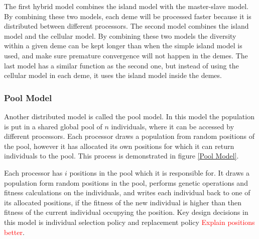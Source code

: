\noindent The first hybrid model combines the island model with the master-slave model. By combining these two models, each deme will be processed faster because it is distributed between different processors. The second model combines the island model and the cellular model. By combining these two models the diversity within a given deme can be kept longer than when the simple island model is used, and make sure premature convergence will not happen in the demes. The last model has a similar function as the second one, but instead of using the cellular model in each deme, it uses the island model inside the demes. \\


\subsubsection{Pool Model}
Another distributed model is called the pool model. In this model the population is put in a shared global pool of $n$ individuals, where it can be accessed by different processors. Each processor draws a population from random positions of the pool, however it has allocated its own positions for which it can return individuals to the pool. This process is demonstrated in figure \ref{Pool Model}. 




Each processor has $i$ positions in the pool which it is responsible for. It draws a population form random positions in the pool, performs genetic operations and fitness calculations on the individuals, and writes each individual back to one of its allocated positions, if the fitness of the new individual is higher than then fitness of the current individual occupying the position. Key design decisions in this model is individual selection policy and replacement policy \textcolor{red}{Explain positions better}. 